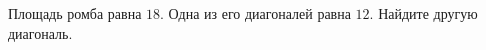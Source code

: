 \begin{ex}
	\begin{condition}
		Площадь ромба равна \( 18 \). Одна из его диагоналей равна \( 12 \). Найдите другую диагональ.
	\end{condition}
\end{ex}